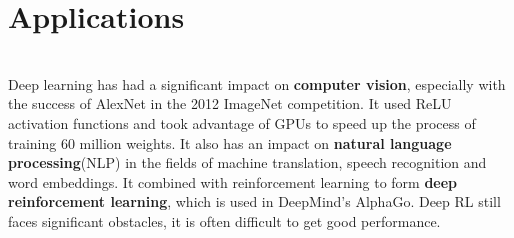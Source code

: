\documentclass{article}
\begin{document}
\section{Applications}
\begin{paragraph}
\\
Deep learning has had a significant impact on \textbf{computer vision}, especially with the success of AlexNet in the 2012 ImageNet competition. It used ReLU activation functions and took advantage of GPUs to speed up the process of training 60 million weights. It also has an impact on \textbf{natural language processing}(NLP) in the fields of machine translation, speech recognition and word embeddings. It combined with reinforcement learning to form \textbf{deep reinforcement learning}, which is used in DeepMind's AlphaGo. Deep RL still faces significant obstacles, it is often difficult to get good performance.
\end{paragraph}
\end{document}
